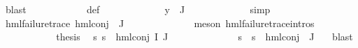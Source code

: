\begin{isabellebody}
\ blast\isanewline
\ \ \ \ \ \ \ \ \ \ \isamarkupfalse%
\ {\isasymPsi}{\isacharunderscore}{\kern0pt}def\ \isanewline
\ \ \ \ \ \ \ \ \ \ \isamarkupfalse%
\ {\isacartoucheopen}y\ {\isasymin}\ {\isasymPhi}{\isacharbackquote}{\kern0pt}J{\isacartoucheclose}\ \isanewline
\ \ \ \ \ \ \ \ \ \ \isamarkupfalse%
\ simp\isanewline
\ \ \ \ \ \ \ \ \isamarkupfalse%
\ {\isachardoublequoteopen}hml{\isacharunderscore}{\kern0pt}failure{\isacharunderscore}{\kern0pt}trace\ {\isacharparenleft}{\kern0pt}hml{\isacharunderscore}{\kern0pt}conj\ {\isacharbraceleft}{\kern0pt}{\isacharbraceright}{\kern0pt}\ J\ {\isasymPsi}{\isacharparenright}{\kern0pt}{\isachardoublequoteclose}\ \isanewline
\ \ \ \ \ \ \ \ \ \ \isamarkupfalse%
\ {\isacharparenleft}{\kern0pt}meson\ hml{\isacharunderscore}{\kern0pt}failure{\isacharunderscore}{\kern0pt}trace{\isachardot}{\kern0pt}intros{\isacharparenleft}{\kern0pt}{}{\isacharparenright}{\kern0pt}{\isacharparenright}{\kern0pt}\isanewline
\ \ \ \ \ \ \ \ \isamarkupfalse%
\ \isamarkupfalse%
\ {\isacharquery}{\kern0pt}thesis\ \isamarkupfalse%
\ {\isacartoucheopen}{\isasymforall}s{\isachardot}{\kern0pt}\ {\isasymnot}s\ {\isasymTurnstile}\ {\isacharparenleft}{\kern0pt}hml{\isacharunderscore}{\kern0pt}conj\ I\ J\ {\isasymPhi}{\isacharparenright}{\kern0pt}{\isacartoucheclose}\ \isanewline
\ \ \ \ \ \ \ \ \ \ \isamarkupfalse%
\ {\isacartoucheopen}{\isasymforall}s{\isachardot}{\kern0pt}\ {\isasymnot}\ s\ {\isasymTurnstile}\ hml{\isacharunderscore}{\kern0pt}conj\ {\isacharbraceleft}{\kern0pt}{\isacharbraceright}{\kern0pt}\ J\ {\isasymPsi}{\isacartoucheclose}\ \isamarkupfalse%
\ blast\isanewline
\ \ \ \ \ \ \isamarkupfalse%
\isanewline
\ \ \ \ \isamarkupfalse%
\isanewline
\ \ \isamarkupfalse%
\ \isanewline
{}\isamarkupfalse%
%
\endisatagproof
{\isafoldproof}%
%
\isadelimproof
\isanewline
%
\endisadelimproof
{}\isamarkupfalse%
\isanewline
%
\isadelimtheory
%
\endisadelimtheory
%
\isatagtheory
{}\isamarkupfalse%
%
\endisatagtheory
{\isafoldtheory}%
%
\isadelimtheory
%
\endisadelimtheory
%
\end{isabellebody}%
\endinput
